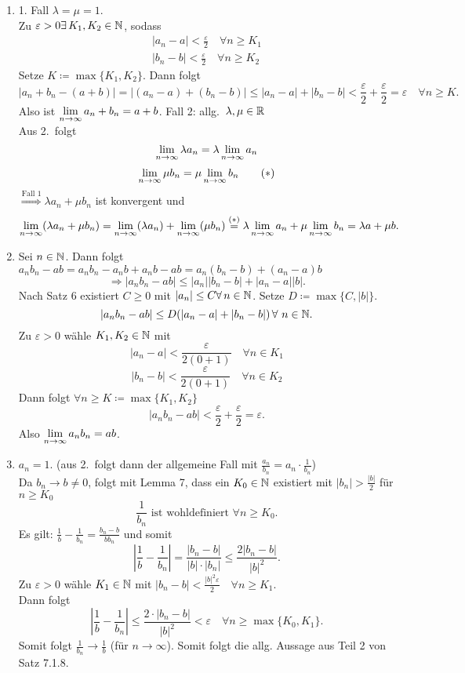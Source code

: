 \documentclass[../ana1.tex]{subfiles}
\begin{document}
\begin{bew}\leavevmode
	\begin{enumerate}
		\item 1. Fall \(\lambda = \mu = 1\).\\
		Zu \(\varepsilon>0 \exists K_1, K_2 \in\N \), sodass
		\begin{align*}
			|a_n-a|<\frac{\varepsilon}{2} \quad \forall n\geq K_1\\
			|b_n-b|<\frac{\varepsilon}{2} \quad \forall n\geq K_2
		\end{align*}
		Setze \(K \coloneqq \max \{K_1, K_2\} \). Dann folgt 
		\[|a_n + b_n - (a+b)| = |(a_n-a)+(b_n-b)| \leq |a_n-a|+|b_n-b| < \frac{\varepsilon}{2} + \frac{\varepsilon}{2} = \varepsilon \quad \forall n\geq K.\]
		Also ist \(\lim\limits_{n\rightarrow\infty}a_n+b_n=a+b\).
		Fall 2: allg.\  \(\lambda,\mu\in\mathbb{R} \) \\
		Aus 2.\ folgt 
		\[\lim\limits_{n\rightarrow\infty} \lambda a_n = \lambda \lim\limits_{n\rightarrow\infty} a_n\]
		\[\lim\limits_{n\rightarrow\infty} \mu b_n = \mu \lim\limits_{n\rightarrow\infty} b_n \qquad(*)\]
		\(\overset{\text{Fall 1}}{\Rightarrow} \lambda a_n + \mu b_n\) ist konvergent und 
		\[\lim\limits_{n\rightarrow\infty} (\lambda a_n + \mu b_n) = \lim\limits_{n\rightarrow\infty} (\lambda a_n) + \lim\limits_{n\rightarrow\infty} (\mu b_n) \overset{(*)}{=} \lambda \lim\limits_{n\rightarrow\infty} a_n + \mu \lim\limits_{n\rightarrow\infty} b_n = \lambda a + \mu b.\]
		\item Sei \(n\in\mathbb{N} \). Dann folgt \(a_n b_n-ab = a_n b_n -a_n b + a_n b - ab=a_n(b_n-b)+(a_n-a)b\)
		\[\Rightarrow |a_n b_n -ab|\leq |a_n| |b_n-b| + |a_n-a||b|.\]
		Nach Satz 6 existiert \(C\geq 0\) mit \(|a_n|\leq C \forall n\in\N \). Setze \(D\coloneqq \max \{C, |b|\} \).
		\[|a_n b_n - ab| \leq D(|a_n-a|+|b_n-b|) \,\forall \, n\in\N.\]
		Zu \(\varepsilon > 0\) wähle \(K_1,K_2\in\mathbb{N} \) mit 
		\[|a_n-a|<\frac{\varepsilon}{2(0+1)} \quad \forall n\in K_1\]
		\[|b_n-b|<\frac{\varepsilon}{2(0+1)} \quad \forall n\in K_2\]
		Dann folgt \(\forall n\geq K \coloneqq \max \{K_1, K_2\} \)
		\[|a_n b_n - ab|<\frac{\varepsilon}{2} + \frac{\varepsilon}{2} = \varepsilon.\]
		Also \(\lim\limits_{n\rightarrow\infty} a_n b_n = ab\).
		\item \Obda{} \(a_n = 1\). (aus 2.\ folgt dann der allgemeine Fall mit \( \frac{a_n}{b_n} = a_n \cdot\frac{1}{b_n} \))\\
		Da \(b_n \rightarrow b \neq 0\), folgt mit Lemma 7, dass ein \(K_0\in\mathbb{N} \) existiert mit \(|b_n| >\frac{|b|}{2} \) für \(n\geq K_0\) 
		\[\frac{1}{b_n} \text{ ist wohldefiniert } \forall n\geq K_0.\]
		Es gilt: \( \frac{1}{b} - \frac{1}{b_n} = \frac{b_n - b}{b b_n} \) und somit 
		\[ \left| \frac{1}{b} - \frac{1}{b_n} \right| = \frac{|b_n-b|}{|b| \cdot |b_n|} \leq \frac{2 |b_n - b|}{|b|^2}. \]
		Zu \(\varepsilon >0 \) wähle \(K_1 \in \mathbb{N} \) mit \(|b_n - b| < \frac{|b|^2\varepsilon}{2} \quad \forall n\geq K_1 \).\\
		Dann folgt 
		\[ \left| \frac{1}{b} - \frac{1}{b_n} \right| \leq \frac{2 \cdot |b_n - b|}{|b|^2} < \varepsilon \quad \forall n\geq\max \{ K_0,K_1\}. \]
		Somit folgt \( \frac{1}{b_n} \rightarrow \frac{1}{b} \) (für \(n\rightarrow \infty \)). Somit folgt die allg. Aussage aus Teil 2 von Satz 7.1.8.
	\end{enumerate}
\end{bew}
\end{document}

